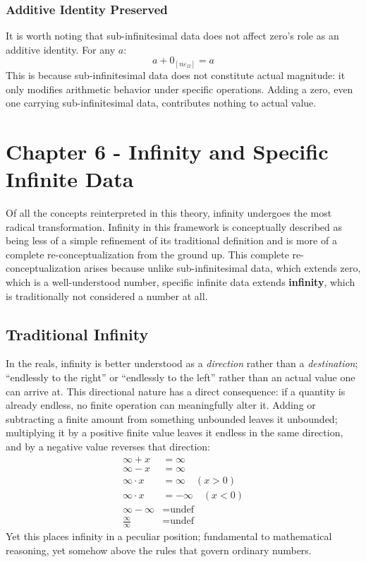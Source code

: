 \documentclass{article}
\begin{document}
\subsubsection*{Additive Identity Preserved}

It is worth noting that sub-infinitesimal data does not affect zero's role as an 
additive identity. For any $a$:
$$a + 0_{[n\varepsilon_\Omega]} = a$$
This is because sub-infinitesimal data does not constitute actual magnitude: it 
only modifies arithmetic behavior under specific operations. Adding a zero, even one 
carrying sub-infinitesimal data, contributes nothing to actual value.
\newpage

\section{Chapter 6 - Infinity and Specific Infinite Data}

Of all the concepts reinterpreted in this theory, infinity undergoes the most 
radical transformation. Infinity in this framework is conceptually described as being less of a simple refinement of its traditional definition and is more of
a complete re-conceptualization from the ground up. This complete re-conceptualization arises because 
unlike sub-infinitesimal data, which extends zero, which is a well-understood number,  
specific infinite data extends \textbf{infinity}, which is traditionally not 
considered a number at all.

\subsection{Traditional Infinity}

In the reals, infinity is better understood as a \textit{direction} rather than a 
\textit{destination}; ``endlessly to the right'' or ``endlessly to the left'' 
rather than an actual value one can arrive at. This directional nature has a direct 
consequence: if a quantity is already endless, no finite operation can meaningfully 
alter it. Adding or subtracting a finite amount from something unbounded leaves it 
unbounded; multiplying it by a positive finite value leaves it endless in the same 
direction, and by a negative value reverses that direction:
\begin{align*}
\infty + x &= \infty \\
\infty - x &= \infty \\
\infty \cdot x &= \infty \quad (x > 0)\\
\infty \cdot x &= -\infty \quad (x < 0)\\
\infty - \infty &= \text{undef}\\
\frac{\infty}{\infty} &=\text{undef}
\end{align*}
Yet this places infinity in a peculiar position; fundamental to mathematical reasoning, yet somehow above the rules that govern ordinary numbers.
\end{document}
